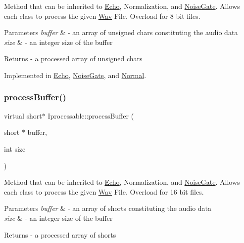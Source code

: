 Method that can be inherited to \hyperlink{classEcho}{Echo}, Normalization, and \hyperlink{classNoiseGate}{Noise\+Gate}. Allows each class to process the given \hyperlink{classWav}{Wav} File. Overload for 8 bit files. 
\begin{DoxyParams}{Parameters}
{\em buffer} & -\/ an array of unsigned chars constituting the audio data \\
\hline
{\em size} & -\/ an integer size of the buffer \\
\hline
\end{DoxyParams}
\begin{DoxyReturn}{Returns}
-\/ a processed array of unsigned chars 
\end{DoxyReturn}


Implemented in \hyperlink{classEcho_ad4e1835e48ebf660a529c68beb28e9d0}{Echo}, \hyperlink{classNoiseGate_a820117e917acd9cdc55e5f4ee46b9231}{Noise\+Gate}, and \hyperlink{classNormal_a3cb50295766e591b7a108cd6e0fc71ba}{Normal}.

\mbox{\label{classIprocessable_a3a379ff1aab98b507892319afbd7eef0}} 
\subsubsection{\texorpdfstring{process\+Buffer()}{processBuffer()}\hspace{0.1cm}{\footnotesize\ttfamily [2/2]}}
{\footnotesize\ttfamily virtual short$\ast$ Iprocessable\+::process\+Buffer (\begin{DoxyParamCaption}\item[{short $\ast$}]{buffer,  }\item[{int}]{size }\end{DoxyParamCaption})\hspace{0.3cm}{\ttfamily [pure virtual]}}

Method that can be inherited to \hyperlink{classEcho}{Echo}, Normalization, and \hyperlink{classNoiseGate}{Noise\+Gate}. Allows each class to process the given \hyperlink{classWav}{Wav} File. Overload for 16 bit files. 
\begin{DoxyParams}{Parameters}
{\em buffer} & -\/ an array of shorts constituting the audio data \\
\hline
{\em size} & -\/ an integer size of the buffer \\
\hline
\end{DoxyParams}
\begin{DoxyReturn}{Returns}
-\/ a processed array of shorts 
\end{DoxyReturn}


